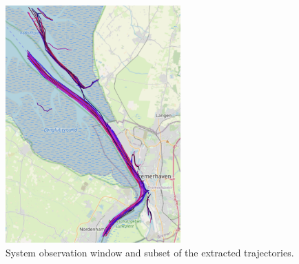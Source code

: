 \begin{figure}[H]
    \centering
    \includegraphics[width=0.6\textwidth]{images/ais/tracks/all_ships.png}
    \caption{System observation window and subset of the extracted trajectories.}
    \label{fig:tracks}
\end{figure}